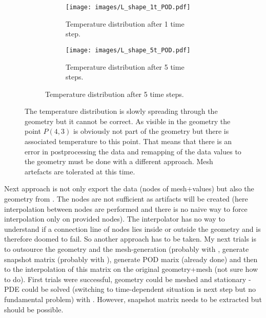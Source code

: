 \documentclass{scrartcl}
\begin{document}
	\begin{figure}[H]
		\begin{figure}[H]
			\begin{minipage}[t]{0.5\linewidth}
				\begin{subfigure}[t]{\linewidth}
					\texttt{[image: images/L\_shape\_1t\_POD.pdf]}
					\caption{Temperature distribution after 1 time step.}
				\end{subfigure}
			\end{minipage}
			\begin{minipage}[t]{0.5\linewidth}
				\begin{subfigure}[t]{\linewidth}
					\texttt{[image: images/L\_shape\_5t\_POD.pdf]}
					\caption{Temperature distribution after 5 time steps.}
				\end{subfigure}
			\end{minipage}
		\end{figure}
		\caption{The temperature distribution is slowly spreading through the geometry but it cannot be correct. As visible in the geometry the point $P(4,3)$ is obviously not part of the geometry but there is associated temperature to this point. That means that there is an error in postprocessing the data and remapping of the data values to the geometry must be done with a different approach. Mesh artefacts are tolerated at this time.}
		\label{}
	\end{figure}
	Next approach is not only export the data (nodes of mesh+values) but also the geometry from \Comsol. The nodes are not sufficient as artifacts will be created (here interpolation between nodes are performed and there is no naive way to \grqq{}force\grqq{} interpolation only on provided nodes). The interpolator has no way to understand if a connection line of nodes lies inside or outside the geometry and is therefore doomed to fail. So another approach has to be taken.
	My next trials is to outsource the geometry and the mesh-generation (probably with \Gmsh, generate snapshot matrix (probably with \Freefem), generate POD marix (already done) and then to the interpolation of this matrix on the original geometry+mesh (not sure how to do). First trials were successful, \ie geometry could be meshed and stationary \Poisson-PDE could be solved (switching to time-dependent situation is next step but no fundamental problem) with \Freefem. However, snapshot matrix needs to be extracted but should be possible.




\end{document}
